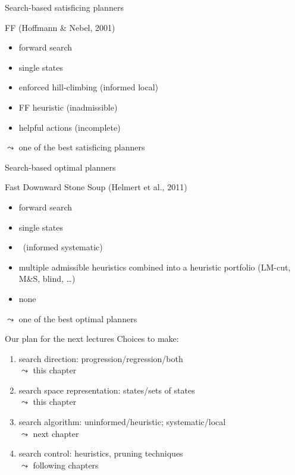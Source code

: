 \documentclass{gkibeamer}
\begin{document}
\begin{frame}{Search-based satisficing planners}
  \begin{block}{FF (Hoffmann \& Nebel, 2001)}
    \begin{itemize}
    \item {} forward search
    \item {} single states
    \item {} enforced hill-climbing (informed
      local)
    \item {} FF heuristic (inadmissible)
    \item {} helpful actions (incomplete)
    \end{itemize}
  \end{block}
  $\leadsto$ one of the best satisficing planners
\end{frame}

\begin{frame}{Search-based optimal planners}
  \begin{block}{Fast Downward Stone Soup (Helmert et al., 2011)}
    \begin{itemize}
    \item {} forward search
    \item {} single states
    \item {} \astar\ (informed
      systematic)
    \item {} multiple admissible heuristics combined
      into a heuristic portfolio (LM-cut, M\&S, blind, \dots)
    \item {} none
    \end{itemize}
  \end{block}
  $\leadsto$ one of the best optimal planners
\end{frame}

\begin{frame}{Our plan for the next lectures}
  Choices to make:
  \begin{enumerate}
  \item search direction: progression/regression/both
    \\ $\leadsto$ \alert{this chapter}
  \item search space representation: states/sets of states
    \\ $\leadsto$ \alert{this chapter}
  \item search algorithm: uninformed/heuristic; systematic/local
    \\ $\leadsto$ \alert{next chapter}
  \item search control: heuristics, pruning techniques
    \\ $\leadsto$ \alert{following chapters}
  \end{enumerate}
\end{frame}
\end{document}
